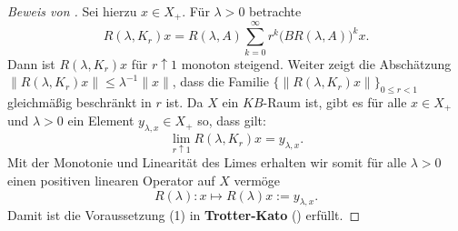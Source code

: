 \begin{proof}[Beweis von ]
\par
Sei hierzu $x\in X_+$. Für $\lambda >0$ betrachte
\begin{equation*}
R(\lambda, K_r)x=R(\lambda, A)\sum_{k=0}^\infty r^k \big(BR(\lambda, A)\big)^kx.
\end{equation*}
Dann ist $R(\lambda, K_r)x$ für $r\uparrow 1$ monoton steigend. Weiter zeigt die Abschätzung $\|R(\lambda, K_r)x\|\leq \lambda^{-1}\|x\|$, dass die Familie $\{\|R(\lambda, K_r)x\|\}_{0\leq r<1}$ gleichmäßig beschränkt in $r$ ist. Da $X$ ein $KB$-Raum ist, gibt es für alle $x\in X_+$ und $\lambda >0$ ein Element $y_{\lambda, x}\in X_+$ so, dass gilt:
\begin{equation*}\label{Grenzwert der Resolventen}
\lim_{r\uparrow 1}R(\lambda, K_r)x = y_{\lambda, x}.
\end{equation*}
Mit der Monotonie und Linearität des Limes erhalten wir somit für alle $\lambda >0$ einen positiven linearen Operator auf $X$ vermöge 
\begin{equation*}
    R(\lambda)\colon x\mapsto R(\lambda)x:=y_{\lambda, x}.
\end{equation*}
Damit ist die Voraussetzung (1) in \textbf{Trotter-Kato} () erfüllt.


\end{proof}
